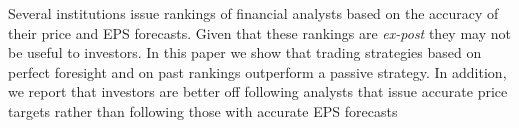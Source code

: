 Several institutions issue rankings of financial analysts based on the accuracy of their price and EPS forecasts. Given that these rankings are \textit{ex-post} they may not be useful to investors. In this paper we show that trading strategies based on perfect foresight and on past rankings outperform a passive strategy. In addition, we report that investors are better off following analysts that issue accurate price targets rather than following those with accurate EPS forecasts
